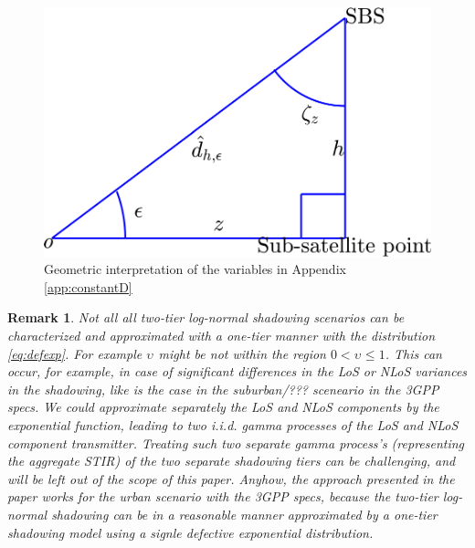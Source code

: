 \documentclass[lettersize,journal]{IEEEtran}
\newtheorem*{remark}{Remark}
\begin{document}
\begin{figure}[h]
  \centering
  \includegraphics[width=0.7\linewidth]{triangle.pdf}
  \caption{Geometric interpretation of the variables in Appendix \ref{app:constantD} }
  \label{fig:triangle}
\end{figure}




\begin{remark}
  Not all all two-tier log-normal shadowing scenarios can be characterized and approximated with a one-tier manner with the distribution \eqref{eq:defexp}. For example $\upsilon_{}$ might be not within the region $0<\upsilon_{} \leq 1$. This can occur, for example, in case of significant differences in the LoS or NLoS variances in the shadowing, like is the case in the suburban/??? sceneario in the 3GPP specs. We could approximate separately the LoS and NLoS components by the exponential function, leading to two i.i.d. gamma processes of the LoS and NLoS component transmitter. Treating such two separate gamma process's (representing the aggregate STIR) of the two separate shadowing tiers can be challenging, and will be left out of the scope of this paper. Anyhow, the approach presented in the paper works for the urban scenario with the 3GPP specs, because the two-tier log-normal shadowing can be in a reasonable manner approximated by a one-tier shadowing model using a signle defective exponential distribution.
\end{remark}



%

\end{document}
